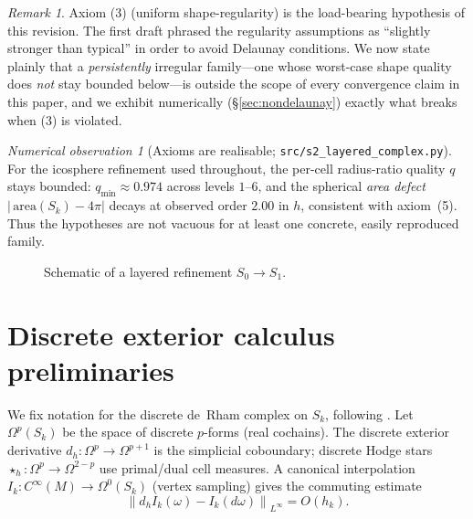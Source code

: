 \documentclass[11pt]{article}
\theoremstyle{plain}
\theoremstyle{definition}
\theoremstyle{remark}
\newtheorem{remark}[theorem]{Remark}
\newtheorem{observation}[theorem]{Numerical observation}
\newcommand{\dext}{d_h}
\newcommand{\hodge}{\star_h}
\newcommand{\Om}{\Omega}
\newcommand{\norm}[1]{\left\lVert #1 \right\rVert}
\newcommand{\Order}{O}
\begin{document}
\begin{remark}
Axiom (3) (uniform shape-regularity) is the load-bearing hypothesis of this
revision. The first draft phrased the regularity assumptions as ``slightly
stronger than typical'' in order to avoid Delaunay conditions. We now state
plainly that a \emph{persistently} irregular family---one whose worst-case shape
quality does \emph{not} stay bounded below---is outside the scope of every
convergence claim in this paper, and we exhibit numerically (\S\ref{sec:nondelaunay})
exactly what breaks when (3) is violated.
\end{remark}

\begin{observation}[Axioms are realisable; \texttt{src/s2\_layered\_complex.py}]
\label{obs:s2}
For the icosphere refinement used throughout, the per-cell radius-ratio quality
$q$ stays bounded: $q_{\min}\approx 0.974$ across levels $1$--$6$, and the
spherical \emph{area defect} $|{\,}\mathrm{area}(S_k)-4\pi|$ decays at observed
order $2.00$ in $h$, consistent with axiom~(5). Thus the hypotheses are not
vacuous for at least one concrete, easily reproduced family.
\end{observation}

\begin{figure}[ht]
\centering
{}
\caption{Schematic of a layered refinement $S_0\to S_1$.}
\end{figure}

\section{Discrete exterior calculus preliminaries}
\label{sec:dec}
We fix notation for the discrete de~Rham complex on $S_k$, following
\citet{hirani2003discrete,desbrun2005discrete,crane2013digital}. Let
$\Om^p(S_k)$ be the space of discrete $p$-forms (real cochains). The discrete
exterior derivative $\dext:\Om^p\to\Om^{p+1}$ is the simplicial coboundary;
discrete Hodge stars $\hodge:\Om^p\to\Om^{2-p}$ use primal/dual cell measures.
A canonical interpolation $I_k:C^\infty(M)\to\Om^0(S_k)$ (vertex sampling) gives
the commuting estimate
\[
\norm{\dext I_k(\omega)-I_k(d\omega)}_{L^\infty}=\Order(h_k).
\]
\end{document}
